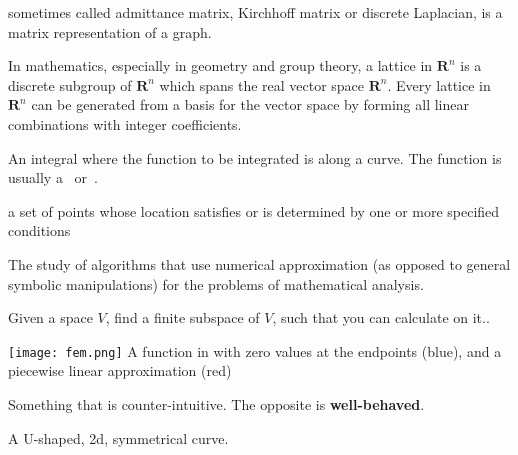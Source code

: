 \begin{definition}
    sometimes called admittance matrix, Kirchhoff matrix or discrete Laplacian,
    is a matrix representation of a graph.

\end{definition}

\begin{definition}[Lattice]
    In mathematics, especially in geometry and group theory, a lattice in
    $\mathbf{R}^n$ is a discrete subgroup of $\mathbf{R}^n$ which spans the real
    vector space $\mathbf{R}^n$. Every lattice in $\mathbf{R}^n$ can be generated
    from a basis for the vector space by forming all linear combinations with
    integer coefficients. 

\end{definition}

\begin{definition}
    An integral where the function to be integrated is along a curve.
    The function is usually a~ or~.

\end{definition}

\begin{definition}[Locus]
    a set of points whose location satisfies or is determined by one or more
    specified conditions

\end{definition}

\begin{definition}
    The study of algorithms that use numerical approximation (as opposed to
    general symbolic manipulations) for the problems of mathematical analysis.

    Given a space $V$, find a finite subspace of $V$, such that you can
    calculate on it..

    \texttt{[image: fem.png]}
    A function in  with zero values at the endpoints (blue), and a piecewise
    linear approximation (red)

\end{definition}

\begin{definition}[Pathological]
    Something that is counter-intuitive. The opposite is \textbf{well-behaved}.

\end{definition}

\begin{definition}[Parabola]
    A U-shaped, 2d, symmetrical curve.
\end{definition}

